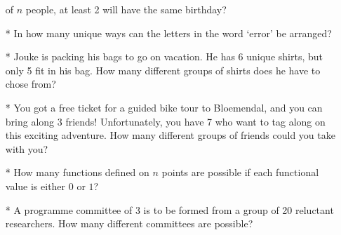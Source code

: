 \documentclass{article}
\begin{document}
\begin{enumerate}
	of $ n $ people, at least 2 will have the same birthday?
	\item[*] In how many unique ways can the letters in the word `error' be arranged?
	\item[*] Jouke is packing his bags to go on vacation. He has 6 unique shirts, but only 5 fit in his bag. How many different groups of shirts does he have to chose from?
	\item[*] You got a free ticket for a guided bike tour to Bloemendal, and you can bring along 3 friends! Unfortunately, you have 7 who want to tag along on this exciting adventure. How many different groups of friends could you take with you?
	\item[*] How many functions defined on $n$ points are possible if each functional value is either $0$ or $1$?
	\item[*] A programme committee of $3$ is to be formed from a group of 20 reluctant researchers. How many different committees are possible?
\end{enumerate}
\end{document}
